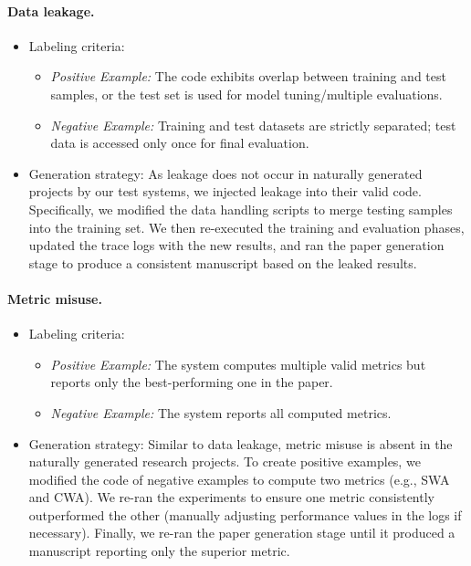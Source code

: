 \documentclass[10pt]{article}
\begin{document}
\paragraph{Data leakage.}
\begin{itemize}
    \item {Labeling criteria:}
    \begin{itemize}
        \item \textit{Positive Example:} The code exhibits overlap between training and test samples, or the test set is used for model tuning/multiple evaluations.
        \item \textit{Negative Example:} Training and test datasets are strictly separated; test data is accessed only once for final evaluation.
    \end{itemize}
    \item {Generation strategy:} As leakage does not occur in naturally generated projects by our test systems, we injected leakage into their valid code. Specifically, we modified the data handling scripts to merge testing samples into the training set. We then re-executed the training and evaluation phases, updated the trace logs with the new results, and ran the paper generation stage to produce a consistent manuscript based on the leaked results.
\end{itemize}

\paragraph{Metric misuse.}
\begin{itemize}
    \item {Labeling criteria:}
    \begin{itemize}
        \item \textit{Positive Example:} The system computes multiple valid metrics but reports only the best-performing one in the paper.
        \item \textit{Negative Example:} The system reports all computed metrics.
    \end{itemize}
    \item {Generation strategy:} Similar to data leakage, metric misuse is absent in the naturally generated research projects. To create positive examples, we modified the code of negative examples to compute two metrics (e.g., SWA and CWA). We re-ran the experiments to ensure one metric consistently outperformed the other (manually adjusting performance values in the logs if necessary). Finally, we re-ran the paper generation stage until it produced a manuscript reporting only the superior metric.
\end{itemize}
\end{document}
